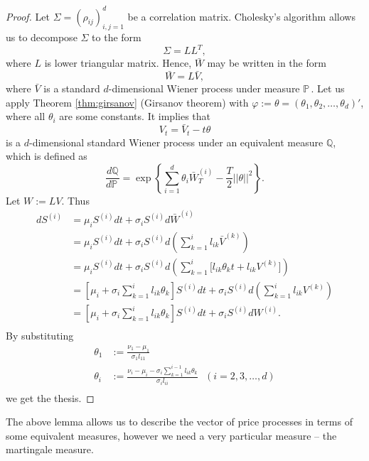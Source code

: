 \documentclass[a4paper,11pt, twoside]{book}
\theoremstyle{definition}
\theoremstyle{remark}
\def\P{{\mathbb{P}}\,}
\begin{document}
\begin{proof}
 Let $\Sigma = (\rho_{ij})_{i,j=1}^d$ be a correlation matrix. Cholesky's algorithm allows us to decompose $\Sigma$ to the form
 \[ \Sigma = LL^T, \]
 where $L$ is lower triangular matrix. Hence, $\bar{W}$ may be written in the form
 \[ \bar{W} = L \bar{V}, \]
 where $\bar{V}$ is a standard $d$-dimensional Wiener process under measure $\P$. Let us apply Theorem \ref{thm:girsanov} (Girsanov theorem) with $\varphi := \theta = (\theta_1, \theta_2, \ldots, \theta_d)'$, where all $\theta_i$ are some constants. It implies that
 \[ V_t = \bar{V}_t - t\theta \]
 is a $d$-dimensional standard Wiener process under an equivalent measure $\mathbb{Q}$, which is defined as
 \[\frac{d\mathbb{Q}}{d\P} = \exp\left\{ \sum\limits_{i=1}^d \theta_i \bar{W}^{(i)}_T - \frac{T}{2} ||\theta||^2 \right\}.\]
 Let $W := LV$. Thus
 \begin{equation*}
  \begin{split}
   dS^{(i)} &= \mu_i S^{(i)} dt + \sigma_i S^{(i)} d\bar{W}^{(i)} \\
            &= \mu_i S^{(i)} dt + \sigma_i S^{(i)} d\left(\sum\limits_{k=1}^i l_{ik} \bar{V}^{(k)}\right) \\
            &= \mu_i S^{(i)} dt + \sigma_i S^{(i)} d\left(\sum\limits_{k=1}^i \bigl[ l_{ik}\theta_k t + l_{ik} V^{(k)} \bigr] \right) \\    
            &= \left[ \mu_i + \sigma_i \sum\limits_{k=1}^i l_{ik}\theta_k \right] S^{(i)}dt + \sigma_i S^{(i)} d\left( \sum\limits_{k=1}^i l_{ik} V^{(k)} \right) \\    
            &= \left[ \mu_i + \sigma_i \sum\limits_{k=1}^i l_{ik}\theta_k \right] S^{(i)}dt + \sigma_i S^{(i)} dW^{(i)}. \\      
  \end{split}
 \end{equation*}
 By substituting
 \begin{align*}
  \theta_1 &:= \frac{\nu_1 - \mu_1}{\sigma_1 l_{11}}\\
  \theta_i &:= \frac{\nu_i - \mu_i - \sigma_i \sum\limits_{k=1}^{i-1} l_{ik}\theta_k}{\sigma_il_{ii}}\ \ \ (i=2,3,\ldots,d)\\
 \end{align*}
 we get the thesis.
\end{proof}

The above lemma allows us to describe the vector of price processes in terms of some equivalent measures, however we need a very particular measure -- the martingale measure.
\end{document}
